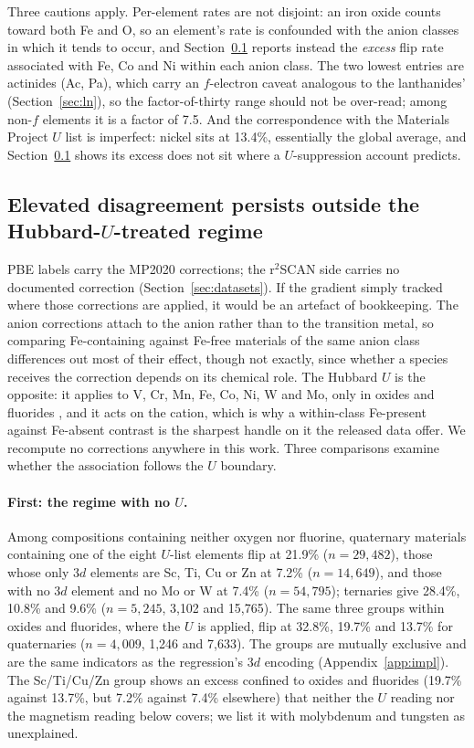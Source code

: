 \documentclass[11pt]{article}
\begin{document}
Three cautions apply. Per-element rates are not disjoint: an iron oxide counts toward
both Fe and O, so an element's rate is confounded with the anion classes in which it
tends to occur, and Section~\ref{sec:u} reports instead the \emph{excess} flip rate
associated with Fe, Co and Ni within each anion class. The two lowest entries are
actinides (Ac, Pa), which carry an $f$-electron caveat analogous to the lanthanides'
(Section~\ref{sec:ln}), so the factor-of-thirty range should not be over-read; among non-$f$
elements it is a factor of 7.5. And the correspondence with the Materials Project $U$
list is imperfect: nickel sits at 13.4\%, essentially the global average, and
Section~\ref{sec:u} shows its excess does not sit where a $U$-suppression account
predicts.


\subsection{Elevated disagreement persists outside the Hubbard-\texorpdfstring{$U$}{U}-treated regime}\label{sec:u}

PBE labels carry the MP2020 corrections; the r$^2$SCAN side carries no documented
correction (Section~\ref{sec:datasets}). If the gradient
simply tracked where those corrections are applied, it would be an artefact of
bookkeeping. The anion corrections \citep{mpanion} attach to the anion rather than to
the transition metal, so comparing Fe-containing against Fe-free materials of the same
anion class differences out most of their effect, though not exactly, since whether a
species receives the correction depends on its chemical role. The Hubbard $U$ is the
opposite: it applies to V, Cr, Mn, Fe, Co, Ni, W and Mo, only in oxides and fluorides
\citep{warford2026,mpanion}, and it acts on the cation, which is why a within-class
Fe-present against Fe-absent contrast is the sharpest handle on it the released data
offer. We recompute no corrections anywhere in this work. Three comparisons examine
whether the association follows the $U$ boundary.

\paragraph{First: the regime with no $U$.} Among compositions containing neither oxygen
nor fluorine, quaternary materials containing one of the eight $U$-list elements flip at
21.9\% ($n=29{,}482$), those whose only 3$d$ elements are Sc, Ti, Cu or Zn at 7.2\%
($n=14{,}649$), and those with no 3$d$ element and no Mo or W at 7.4\% ($n=54{,}795$); ternaries give
28.4\%, 10.8\% and 9.6\% ($n=5{,}245$, 3{,}102 and 15{,}765). The same three groups
within oxides and fluorides, where the $U$ is applied, flip at 32.8\%, 19.7\% and 13.7\%
for quaternaries ($n=4{,}009$, 1{,}246 and 7{,}633). The groups are mutually
exclusive and are the same indicators as the regression's 3$d$ encoding
(Appendix~\ref{app:impl}). The Sc/Ti/Cu/Zn group shows an excess confined to oxides and
fluorides (19.7\% against 13.7\%, but 7.2\% against 7.4\% elsewhere) that neither the
$U$ reading nor the magnetism reading below covers; we list it with
molybdenum and tungsten as unexplained.
\end{document}
